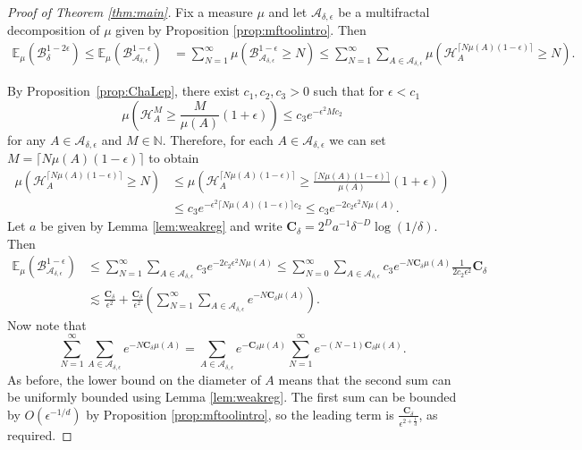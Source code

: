 \documentclass[11pt, reqno]{amsart}
\numberwithin{equation}{section}
\theoremstyle{plain}%
\theoremstyle{definition}
\def\N{\ensuremath{\mathbb N}}
\def\B{\ensuremath{\mathcal B}}
\def\A{\ensuremath{\mathscr A}}
\renewcommand{\H}{\mathcal{H}}
\renewcommand{\A}{\mathcal{A}}
\theoremstyle{nonumberplain}
\begin{document}
\begin{proof}[Proof of Theorem \ref{thm:main}]   
Fix a measure $\mu$ and let $\A_{\delta,\epsilon}$ be a multifractal decomposition of $\mu$ given by Proposition \ref{prop:mftoolintro}. Then
\begin{align*}
\mathbb{E}_\mu(\B_{\delta}^{1-2\epsilon}) \leq\mathbb{E}_\mu(\B_{\A_{\delta,\epsilon}}^{1-{\epsilon}})  &= \sum_{N=1}^\infty \mu\left(\B_{\A_{\delta,\epsilon}}^{1-\epsilon} \geq N\right)\leq \sum_{N=1}^\infty \sum_{A \in \A_{\delta,\epsilon}} \mu\left(\H_A^{\lceil N \mu(A)(1-\epsilon)\rceil} \geq N\right).
\end{align*}

 By Proposition~\ref{prop:ChaLep}, there exist $c_1,c_2,c_3>0$ such that for $\epsilon<c_1$  
$$
\mu\left( \H_A^{M } \geq \frac{M}{\mu(A)} (1+\epsilon)\right) \le c_3 e^{-\epsilon^2Mc_2}
$$
for any $A \in \A_{\delta,\epsilon}$ and $M \in \N$. Therefore, for each $A \in \A_{\delta,\epsilon}$ we can set $M=\lceil N \mu(A)(1-\epsilon)\rceil$ to obtain
\begin{align*}
\mu\left( \H_A^{\lceil N \mu(A)(1-\epsilon)\rceil} \geq N\right) &\leq \mu\left( \H_A^{\lceil N \mu(A)(1-\epsilon)\rceil} \geq \frac{\lceil N \mu(A)(1-\epsilon)\rceil}{\mu(A)}(1+\epsilon)\right)  \\
&    \le c_3 e^{-\epsilon^2\lceil N \mu(A)(1-\epsilon)\rceil c_2} \leq c_3e^{-2c_2\epsilon^2N \mu(A)}.
\end{align*}
Let $a$ be given by Lemma \ref{lem:weakreg} and write  $\mathbf{C}_\delta=2^{D}a^{-1} \delta^{-D} \log (1/\delta)$. Then
\begin{align*}
\mathbb{E}_\mu(\B_{\A_{\delta,\epsilon}}^{1-{\epsilon}}) &\leq \sum_{N=1}^\infty \sum_{A \in \A_{\delta,\epsilon}} c_3e^{-2c_2\epsilon^2N \mu(A)}\leq  \sum_{N=0}^\infty \sum_{A \in \A_{\delta,\epsilon}} c_3 e^{-N \mathbf{C}_\delta \mu(A)} \frac{1}{2c_2\epsilon^2} \mathbf{C}_\delta\\
&\lesssim \frac{ \mathbf{C}_\delta}{\epsilon^2}+ \frac{ \mathbf{C}_\delta}{\epsilon^2} \left( \sum_{N=1}^\infty \sum_{A \in \A_{\delta,\epsilon}}e^{-N \mathbf{C}_\delta \mu(A)}\right).
\end{align*}
Now note that 
$$ \sum_{N=1}^\infty \sum_{A \in\A_{\delta,\epsilon}}e^{-N \mathbf{C}_\delta \mu(A)}= \sum_ {A \in \A_{\delta,\epsilon}} e^{-\mathbf{C}_\delta \mu(A)} \sum_{N=1}^{\infty} e^{-(N-1)\mathbf{C}_\delta \mu(A)}.$$
As before, the lower bound on the diameter of $A$ means that the second sum can be uniformly bounded using Lemma \ref{lem:weakreg}. The first sum can be bounded by $O(\epsilon^{-1/d})$ by Proposition \ref{prop:mftoolintro}, so the leading term is $\frac{ \mathbf{C}_\delta}{\epsilon^{2+\frac1d}}$, as required.
\end{proof}
\end{document}
